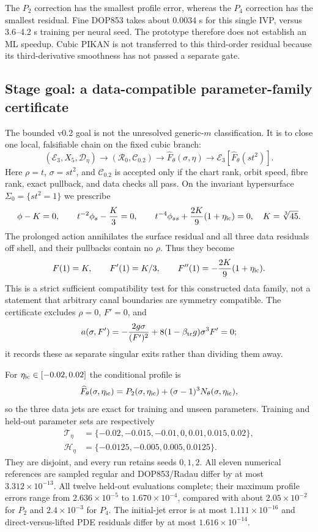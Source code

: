 \documentclass[11pt]{article}
\newcommand{\E}{\mathcal E}
\begin{document}
The $P_2$ correction has the smallest profile error, whereas the $P_4$
correction has the smallest residual. Fine DOP853 takes about 0.0034 s for this
single IVP, versus 3.6--4.2 s training per neural seed. The prototype therefore
does not establish an ML speedup. Cubic PIKAN is not transferred to this
third-order residual because its third-derivative smoothness has not passed a
separate gate.

\subsection{Stage goal: a data-compatible parameter-family certificate}
The bounded v0.2 goal is not the unresolved generic-$m$ classification. It is
to close one local, falsifiable chain on the fixed cubic branch:
\[
 (\E_3,X_5,\mathcal D_\eta)
 \longrightarrow (\mathcal R_0,\mathcal C_{0.2})
 \longrightarrow \widehat F_\theta(\sigma,\eta)
 \longrightarrow \E_3[\widehat F_\theta(st^2)].
\]
Here $\rho=t$, $\sigma=st^2$, and $\mathcal C_{0.2}$ is accepted only if the
chart rank, orbit speed, fibre rank, exact pullback, and data checks all pass.
On the invariant hypersurface $\Sigma_0=\{st^2=1\}$ we prescribe
\[
 \phi-K=0,\qquad t^{-2}\phi_s-\frac K3=0,\qquad
 t^{-4}\phi_{ss}+\frac{2K}{9}(1+\eta_{\rm ic})=0,
 \quad K=\sqrt[3]{45}.
\]
The prolonged action annihilates the surface residual and all three data
residuals off shell, and their pullbacks contain no $\rho$. Thus they become
\[
 F(1)=K,\qquad F'(1)=K/3,\qquad
 F''(1)=-\frac{2K}{9}(1+\eta_{\rm ic}).
\]
This is a strict sufficient compatibility test for this constructed data
family, not a statement that arbitrary canal boundaries are symmetry
compatible. The certificate excludes $\rho=0$, $F'=0$, and
\[
 a(\sigma,F')=-\frac{2g\sigma}{(F')^2}
 +8(1-\beta_{\rm tr}g)\sigma^3F'=0;
\]
it records these as separate singular exits rather than dividing them away.

For $\eta_{\rm ic}\in[-0.02,0.02]$ the conditional profile is
\[
 \widehat F_\theta(\sigma,\eta_{\rm ic})
 =P_2(\sigma,\eta_{\rm ic})
  +(\sigma-1)^3N_\theta(\sigma,\eta_{\rm ic}),
\]
so the three data jets are exact for training and unseen parameters. Training
and held-out parameter sets are respectively
\[
\begin{aligned}
 \mathcal T_\eta&=\{-0.02,-0.015,-0.01,0,0.01,0.015,0.02\},\\
 \mathcal H_\eta&=\{-0.0125,-0.005,0.005,0.0125\}.
\end{aligned}
\]
They are disjoint, and every run retains seeds $0,1,2$. All eleven numerical
references are sampled regular and DOP853/Radau differ by at most
$3.312\times10^{-13}$. All twelve held-out evaluations complete; their
maximum profile errors range from $2.636\times10^{-5}$ to
$1.670\times10^{-4}$, compared with about $2.05\times10^{-2}$ for $P_2$ and
$2.4\times10^{-3}$ for $P_4$. The initial-jet error is at most
$1.111\times10^{-16}$ and direct-versus-lifted PDE residuals differ by at most
$1.616\times10^{-14}$.
\end{document}
